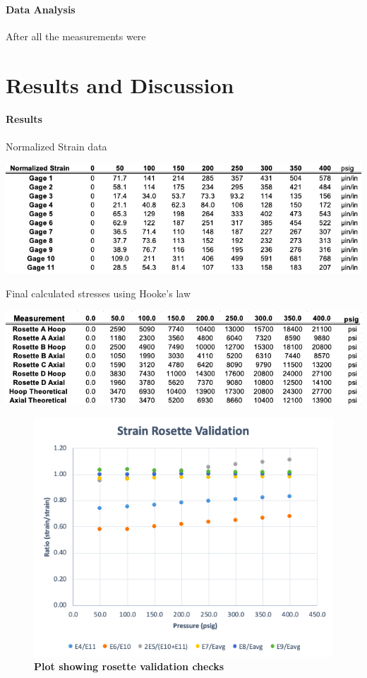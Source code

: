 \documentclass{article}
\begin{document}
\paragraph{Data Analysis}
After all the measurements were 

\section{Results and Discussion}\label{conclusions}
\paragraph {Results} 

\begin{table}[H]
  \caption{Normalized Strain data}
  \includegraphics[width=\linewidth]{table_raw_strain}
  \centering
\end{table}

\begin{table}[H]
  \caption{Final calculated stresses using Hooke's law}
  \includegraphics[width=\linewidth]{table_final_stress}
  \centering
\end{table}

\begin{figure} [H]
	\centering
	\includegraphics [width=\textwidth]{plot_rosette_validation}
	\caption{ \textbf{Plot showing rosette validation checks}}
\end{figure} 
\end{document}
